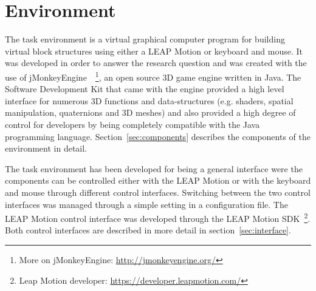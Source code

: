 \section{Environment}


The task environment is a virtual graphical computer program for building virtual block structures using either a LEAP Motion or keyboard and mouse. It was developed in order to answer the research question and was created with the use of jMonkeyEngine~\cite{Irene:2012}~\footnote{More on jMonkeyEngine: \url{http://jmonkeyengine.org/}}, an open source 3D game engine written in Java. The Software Development Kit that came with the engine provided a high level interface for numerous 3D functions and data-structures (e.g. shaders, spatial manipulation, quaternions and 3D meshes) and also provided a high degree of control for developers by being completely compatible with the Java programming language. Section~\ref{sec:components} describes the components of the environment in detail.

The task environment has been developed for being a general interface were the components can be controlled either with the LEAP Motion or with the keyboard and mouse through different control interfaces. Switching between the two control interfaces was managed through a simple setting in a configuration file. The LEAP Motion control interface was developed through the LEAP Motion SDK~\footnote{Leap Motion developer: \url{https://developer.leapmotion.com/}}. Both control interfaces are described in more detail in section~\ref{sec:interface}.





